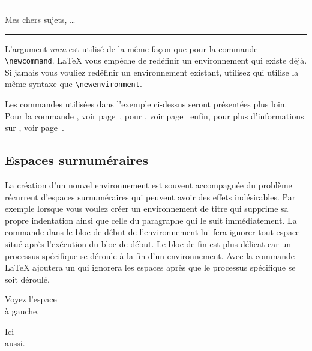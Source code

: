 \begin{example}
\newenvironment{king}
 {\rule{1ex}{1ex}%
      \hspace{\stretch{1}}}
 {%
      \rule{1ex}{1ex}}

\begin{king}
Mes chers sujets, \dots
\end{king}
\end{example}

L'argument \emph{num} est utilisé de la même façon que pour la
commande \verb|\newcommand|. \LaTeX{} vous empêche de redéfinir un
environnement qui existe déjà. Si jamais vous vouliez redéfinir un
environnement existant, utilisez  qui utilise la
même syntaxe que \verb|\newenvironment|.

Les commandes utilisées dans l'exemple ci-dessus seront présentées
plus loin. Pour la commande , voir page~\pageref{sec:rule},
pour , voir page~\pageref{cmd:stretch} enfin, pour plus
d'informations sur , voir page~\pageref{sec:hspace}.

\subsection{Espaces surnuméraires}

La création d'un nouvel environnement est souvent accompagnée du
problème récurrent d'espaces surnuméraires qui peuvent avoir des
effets indésirables. Par exemple lorsque vous voulez créer un
environnement de titre qui supprime sa propre indentation ainsi que
celle du paragraphe qui le suit immédiatement. La commande
 dans le bloc de début de l'environnement lui fera
ignorer tout espace situé après l'exécution du bloc de début. Le bloc
de fin est plus délicat car un processus spécifique se déroule à la
fin d'un environnement. Avec la commande 
\LaTeX{} ajoutera un  qui ignorera les espaces après
que le processus spécifique se soit déroulé.

\begin{example}
\newenvironment{simple}%
 {\noindent}%
 {\par\noindent}

\begin{simple}
Voyez l'espace\\à gauche.
\end{simple}
Ici\\aussi.
\end{example}


